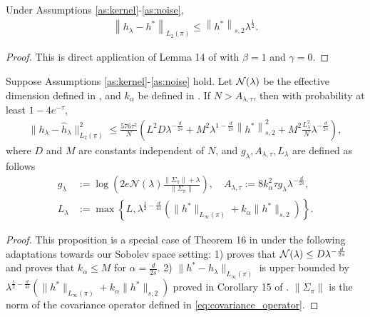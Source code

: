 \begin{prop}\label{prop:krr_bias}
Under Assumptions \ref{as:kernel}-\ref{as:noise}, 
\begin{align*}
    \left\| h_\lambda - h^\ast \right\|_{L_2(\pi)} \leq \left\| h^\ast \right\|_{s,2} \lambda^{\frac{1}{2}} .
\end{align*}
\end{prop}
\begin{proof}
    This is direct application of Lemma 14 of \cite{fischer2020sobolev} with $\beta = 1$ and $ \gamma = 0$.
\end{proof}
\begin{prop}\label{prop:krr_variance}
Suppose Assumptions \ref{as:kernel}-\ref{as:noise} hold. Let $\mathcal{N}(\lambda)$ be the effective dimension defined in ,
and $k_{\alpha}$ be defined in .
If $N > A_{\lambda, \tau}$, then with probability at least $1 - 4e^{-\tau}$,
\begin{align}
    \| h_\lambda - \hat{h}_\lambda \|_{L_2(\pi)}^2 \leq \frac{576 \tau^2}{N} \left( L^2 D \lambda^{ -\frac{d}{2s} } + M^2 \lambda^{1 - \frac{d}{2s}} \left\| h^\ast \right \|_{s,2}^2 + M^2 \frac{L_\lambda^2}{N} \lambda^{-\frac{d}{2s}} \right),
\end{align}
where $D$ and $M$ are constants independent of $N$, and $g_\lambda, A_{\lambda, \tau}, L_\lambda$ are defined as follows
\begin{align*}
    g_\lambda &:=\log \left(2 e \mathcal{N}(\lambda) \frac{ \|\Sigma_\pi \| + \lambda}{\|\Sigma_\pi \|} \right), 
    \quad A_{\lambda, \tau} := 8 k_{\alpha}^2 \tau g_\lambda \lambda^{-\frac{d}{2s} }, \\
    L_\lambda &:= \max \left \{ L, \lambda^{\frac{1}{2} - \frac{d}{4s} } \left( \| h^\ast \|_{L_\infty(\pi)} + k_{\alpha} \|  h^\ast  \|_{s,2} \right) \right\} .
\end{align*}

\end{prop}
\begin{proof}
This proposition is a special case of Theorem 16 in \citet{fischer2020sobolev} under the following adaptations towards our Sobolev space setting: 1)  proves that $\mathcal{N}(\lambda) \leq D \lambda^{ -\frac{d}{2s} }$ and  proves that $k_{\alpha} \leq M$ for $\alpha = \frac{d}{2s}$.
2) $\|h^\ast- h_\lambda \|_{L_{\infty}(\pi)}$ is upper bounded by $\lambda^{\frac{1}{2} - \frac{d}{4s} } \left( \| h^\ast \|_{L_\infty(\pi)} + k_{\alpha} \| h^\ast \|_{s,2} \right) $ proved in Corollary 15 of \citet{fischer2020sobolev}. $\| \Sigma_\pi\|$ is the norm of the covariance operator defined in \eqref{eq:covariance_operator}.
\end{proof}
